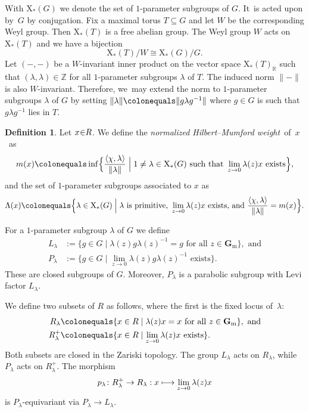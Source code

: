 \documentclass[JEP,XML,SOM,Unicode,NoEqCountersInSection,published]{cedram}
\newcommand\mto{\mathchoice{\longmapsto}{\mapsto}{\mapsto}{\mapsto}}
\theoremstyle{plain}
\theoremstyle{definition}
\newtheorem{definition}[theorem]{Definition}
\newcommand\cocharacters{\ensuremath{\mathrm{X}_*}}
\newcommand\Gm{\ensuremath{\mathbf{G}_{\mathrm{m}}}}
\begin{document}
With $\cocharacters(G)$ we denote the set of $1$-parameter subgroups of $G$. It~is acted upon by~$G$ by conjugation.
Fix a maximal torus $T \subseteq G$ and let $W$ be the corresponding Weyl group.
Then $\cocharacters(T)$ is a free abelian group. The Weyl group $W$ acts on $\cocharacters(T)$ and we have a bijection
\begin{equation}\label{equation:cocharacters}
\cocharacters(T)/W \cong \cocharacters(G)/G.
\end{equation}
Let $(-,-)$ be a $W$-invariant inner product on the vector space $\cocharacters(T)_\mathbb{R}$
such that $(\lambda,\lambda) \in \mathbb{Z}$ for all $1$-parameter subgroups $\lambda$ of $T$.
The induced norm $\|{-}\|$ is also $W$\nobreakdash-invariant.
Therefore, we~may extend the norm to $1$-parameter subgroups $\lambda$ of $G$
by setting $\|\lambda\|\colonequals\|g\lambda g^{-1}\|$ where $g \in G$ is such that $g\lambda g^{-1}$ lies in $T$.

\begin{definition}
Let $x \mkern-4mu\in\mkern-5mu R$. We define the \emph{normalized Hilbert--Mumford weight}~of~$x$~as
\begin{equation*}
m(x)\colonequals \inf\Bigl\{ \frac{\langle\chi,\lambda\rangle}{\|\lambda\|}\Bigm| 1 \neq \lambda \in \cocharacters(G) \text{ such that } \lim_{z\to 0} \lambda(z)x \text{ exists}\Bigr\},
\end{equation*}
and the set of $1$-parameter subgroups associated to $x$ as
\begin{equation*}
\Lambda(x) \colonequals \Bigl\{ \lambda \in \cocharacters(G)\Bigm|\lambda \text{ is primitive, } \lim_{z\to 0} \lambda(z)x \text{ exists, and } \frac{\langle\chi,\lambda\rangle}{\|\lambda\|} = m(x) \Bigr\}.
\end{equation*}
\end{definition}

For a $1$-parameter subgroup $\lambda$ of $G$ we define
\begin{align}%
L_\lambda &:= \{ g \in G\mid \lambda(z)g\lambda(z)^{-1} = g \text{ for all } z \in \Gm \}, \text{ and}\\
P_\lambda &:= \{ g \in G\mid \lim_{z \to 0} \lambda(z)g\lambda(z)^{-1} \text{ exists}\}.
\end{align}
These are closed subgroups of $G$.
Moreover, $P_\lambda$ is a parabolic subgroup with Levi factor $L_\lambda$.

We define two subsets of $R$ as follows,
where the first is the fixed locus of~$\lambda$:
\begin{align*}
R_\lambda & \colonequals \{ x \in R \mid \lambda(z)x = x \text{ for all } z \in \Gm \}, \text{ and} \\
R_\lambda^+ & \colonequals \{ x \in R \mid \lim_{z \to 0}\lambda(z)x \text{ exists}\}.
\end{align*}
Both subsets are closed in the Zariski topology.
The group $L_\lambda$ acts on $R_\lambda$, while $P_\lambda$ acts on $R_\lambda^+$.
The morphism
\begin{equation}
\label{equation:p-lambda}
p_\lambda\colon R_\lambda^+ \to R_\lambda:x\mto\lim_{z \to 0}\lambda(z)x
\end{equation}
is $P_\lambda$-equivariant via $P_\lambda \to L_\lambda$.
\end{document}
